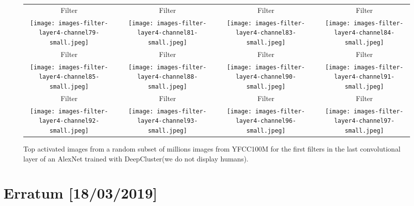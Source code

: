 \documentclass[runningheads]{llncs}
\def\OURS{DeepCluster\xspace}
\begin{document}
\begin{figure}[t]
\centering
\begin{tabular}{ccccccc}
Filter  && Filter  && Filter  && Filter 
\\
\texttt{[image: images-filter-layer4-channel79-small.jpeg]}&&
\texttt{[image: images-filter-layer4-channel81-small.jpeg]}&&
\texttt{[image: images-filter-layer4-channel83-small.jpeg]}&&
\texttt{[image: images-filter-layer4-channel84-small.jpeg]}
\\
Filter  && Filter  && Filter  && Filter 
\\
\texttt{[image: images-filter-layer4-channel85-small.jpeg]}&&
\texttt{[image: images-filter-layer4-channel88-small.jpeg]}&&
\texttt{[image: images-filter-layer4-channel90-small.jpeg]}&&
\texttt{[image: images-filter-layer4-channel91-small.jpeg]}
\\
Filter  && Filter  && Filter  && Filter 
\\
\texttt{[image: images-filter-layer4-channel92-small.jpeg]}&&
\texttt{[image: images-filter-layer4-channel93-small.jpeg]}&&
\texttt{[image: images-filter-layer4-channel96-small.jpeg]}&&
\texttt{[image: images-filter-layer4-channel97-small.jpeg]}
\end{tabular}
\caption{
  Top  activated images from a random subset of  millions images from YFCC100M for the  first filters in the last convolutional layer of an AlexNet trained with \OURS (we do not display humans).
}
\label{fig:waouh2}
\end{figure}

\section{Erratum [18/03/2019]}
\end{document}
